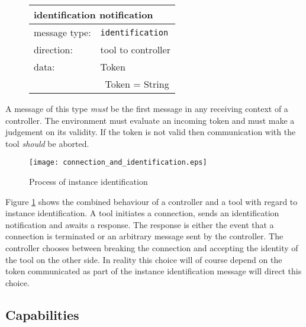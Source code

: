 \documentclass{article}
\newcommand{\msg}[1]{\texttt{#1}}
\begin{document}
   \begin{figure}[H]
    \begin{center}
     \begin{tabular}{|ll|}
      \hline
       \multicolumn{2}{|l|}{\textbf{identification notification}} \\
      \hline
       message type:    & \msg{identification} \\
      \hline
       direction:       & tool to controller \\
       data:            & Token \\
                        & \ Token = String \\
      \hline
     \end{tabular}
     \vspace{-0.3cm}
    \end{center}
   \end{figure}

   \noindent A message of this type \emph{must} be the first message in any
   receiving context of a controller. The environment must evaluate an incoming
   token and must make a judgement on its validity. If the token is not valid
   then communication with the tool \emph{should} be aborted.

   \begin{figure}[H]
    \begin{center}
     \texttt{[image: connection\_and\_identification.eps]}
    \end{center}
    \vspace{-0.3cm}
    \caption{Process of instance identification}
    \label{fig::identification}
   \end{figure}

   \noindent Figure \ref{fig::identification} shows the combined behaviour of a
   controller and a tool with regard to instance identification. A tool
   initiates a connection, sends an identification notification and awaits a
   response. The response is either the event that a connection is terminated
   or an arbitrary message sent by the controller. The controller chooses
   between breaking the connection and accepting the identity of the tool on
   the other side. In reality this choice will of course depend on the token
   communicated as part of the instance identification message will direct this
   choice.

  \subsection{Capabilities}
\end{document}
